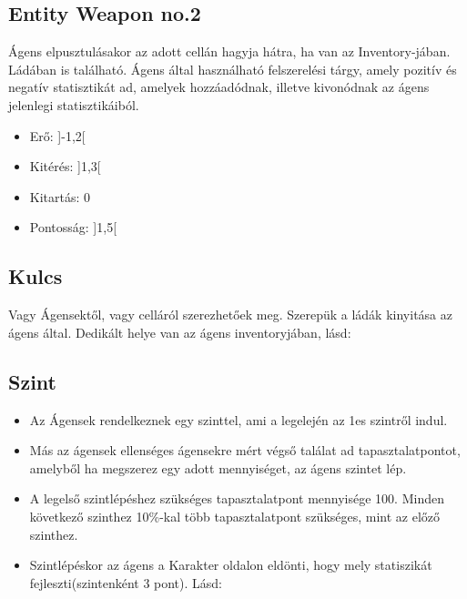 \subsection{Entity Weapon no.2}

Ágens elpusztulásakor az adott cellán hagyja hátra, ha van az Inventory-jában. Ládában is található.
Ágens által használható felszerelési tárgy, amely pozitív és negatív statisztikát ad, amelyek hozzáadódnak, illetve kivonódnak az ágens jelenlegi statisztikáiból.

\begin{itemize}
    \item Erő: ]-1,2[
    \item Kitérés: ]1,3[
    \item Kitartás: 0
    \item Pontosság: ]1,5[
\end{itemize}

\subsection{Kulcs}

Vagy Ágensektől, vagy celláról szerezhetőek meg.
Szerepük a ládák kinyitása az ágens által.
Dedikált helye van az ágens inventoryjában, lásd: 


\subsection{Szint}

\begin{itemize}
    \item Az Ágensek rendelkeznek egy szinttel, ami a legelején az 1es szintről indul.
    \item Más az ágensek ellenséges ágensekre mért végső találat ad tapasztalatpontot, amelyből ha megszerez egy adott mennyiséget, az ágens szintet lép.
    \item A legelső szintlépéshez szükséges tapasztalatpont mennyisége 100. Minden következő szinthez 10\%-kal több tapasztalatpont szükséges, mint az előző szinthez.
    \item Szintlépéskor az ágens a Karakter oldalon eldönti, hogy mely statiszikát fejleszti(szintenként 3 pont). Lásd: 
\end{itemize}

